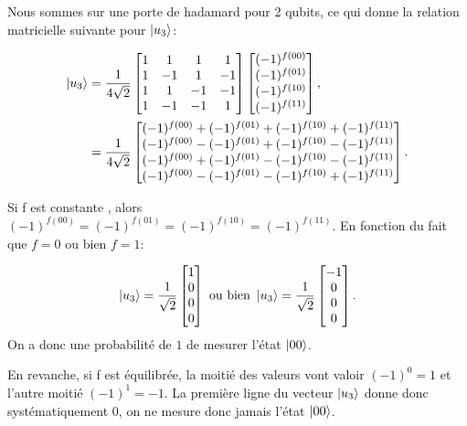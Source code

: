 Nous sommes sur une porte de hadamard pour 2 qubits, ce qui donne
la relation matricielle suivante pour $\ket{u_3}$:

\begin{align}
\ket{u_3} &=
\frac{1}{4\sqrt{2}} 
\begin{bmatrix}
  1 & 1 & 1 & 1 \\
  1 & -1 & 1 & -1 \\
  1 & 1 & -1 & -1 \\
  1 & -1 & -1 & 1 \\
\end{bmatrix}
\begin{bmatrix}
  (-1)^{f(00)} \\ (-1)^{f(01)} \\ (-1)^{f(10)} \\ (-1)^{f(11)}
\end{bmatrix} , \nonumber \\ 
 &= \frac{1}{4\sqrt{2}} 
\begin{bmatrix}
  (-1)^{f(00)} + (-1)^{f(01)} + (-1)^{f(10)} + (-1)^{f(11)} \\
  (-1)^{f(00)} - (-1)^{f(01)} + (-1)^{f(10)} - (-1)^{f(11)} \\
  (-1)^{f(00)} + (-1)^{f(01)} - (-1)^{f(10)} - (-1)^{f(11)} \\
  (-1)^{f(00)} - (-1)^{f(01)} - (-1)^{f(10)} + (-1)^{f(11)} \\
\end{bmatrix}.
\end{align}

Si f est constante , alors
$(-1)^{f(00)} = (-1)^{f(01)} = (-1)^{f(10)} = (-1)^{f(11)}$. En
fonction du fait que $f=0$ ou bien $f=1$:

\begin{equation}
  \label{eq:6}
\ket{u_3}=
\frac{1}{\sqrt{2}} 
\begin{bmatrix}
  1 \\ 0 \\ 0 \\ 0
\end{bmatrix}  \text{ ou bien }
\ket{u_3}=
\frac{1}{\sqrt{2}} 
\begin{bmatrix}
  -1 \\ 0 \\ 0 \\ 0
\end{bmatrix}.
\end{equation}
On a donc une probabilité de $1$ de mesurer l'état $\ket{00}$.

En revanche, si f est équilibrée, la moitié des valeurs vont
valoir $(-1)^{0} = 1$ et l'autre moitié $(-1)^{1} = -1$. La première
ligne du vecteur $\ket{u_3}$ donne donc systématiquement 0, on ne mesure donc
jamais l'état $\ket{00}$.

